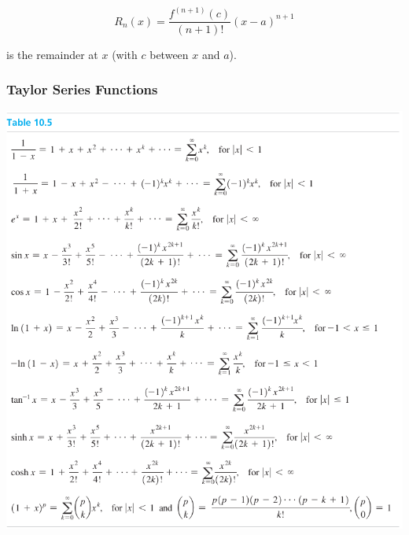 \begin{equation}
    R_n(x) = \frac{f^{(n + 1)}(c)}{(n + 1)!}(x - a)^{n + 1}
\end{equation}

is the remainder at $x$ (with $c$ between $x$ and $a$).

\subsubsection{Taylor Series Functions}
\begin{center}
    \includegraphics{assets/table.pdf}
\end{center}
